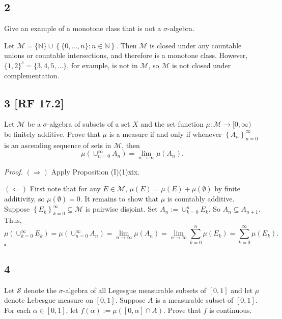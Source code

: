 \documentclass[12pt]{article}
\newcounter{ProofCounter}
\newenvironment{Proof}{\stepcounter{ProofCounter}\textit{Proof.}}{\hfill$\square$}
\begin{document}
\newpage
\subsection*{2}
\begin{tcolorbox}
Give an example of a monotone class that is not a $\sigma$-algebra.
\end{tcolorbox}

Let $\mathcal{M} = \{\mathbb{N}\} \cup \left\{ \{0,\hdots,n\} : n \in \mathbb{N} \right\}$. Then $\mathcal{M}$ is closed under any
countable unions or countable intersections, and therefore is a monotone class. However, $\{1,2\}^{c} = \{3, 4, 5, \hdots\}$, for example, is not in
$\mathcal{M}$, so $\mathcal{M}$ is not closed under complementation.



\subsection*{3 [RF 17.2]}
\begin{tcolorbox}
Let $\mathcal{M}$ be a $\sigma$-algebra of subsets of a set $X$ and the set function $\mu : \mathcal{M} \rightarrow [0, \infty)$ be finitely additive.
Prove that $\mu$ is a measure if and only if whenever $\left\{ A_{n} \right\}_{n=0}^{\infty}$ is an ascending sequence of sets in $\mathcal{M}$, then 
\[ \mu\left( \cup_{n=0}^{\infty}A_{n} \right) = \lim_{n\rightarrow\infty}\mu(A_{n}). \]
\end{tcolorbox}


\begin{Proof}
$(\Rightarrow)$ Apply Proposition (I)(1)xix.

$(\Leftarrow)$ First note that for any $E \in \mathcal{M}$, $\mu(E) = \mu(E) + \mu(\emptyset)$ by finite additivity, so $\mu(\emptyset) = 0$. It
remains to show that $\mu$ is countably additive. Suppose $\left\{ E_{k} \right\}_{k=0}^{\infty} \subseteq \mathcal{M}$ is pairwise disjoint. Set
$A_{n} := \cup_{k=0}^{n}E_{k}$. So $A_{n} \subseteq A_{n+1}$. Thus,
\[ \mu\left( \cup_{k=0}^{\infty}E_{k} \right) = \mu\left( \cup_{n=0}^{\infty}A_{n} \right) = \lim_{n\rightarrow\infty}\mu(A_{n}) =
\lim_{n\rightarrow\infty}\sum_{k=0}^{n}\mu(E_{k}) = \sum_{k=0}^{\infty}\mu(E_{k}). \]
\end{Proof}


\subsection*{4}
\begin{tcolorbox}
Let $\mathcal{S}$ denote the $\sigma$-algebra of all Legesgue measurable subsets of $[0,1]$ and let $\mu$ denote Lebesgue measure on $[0,1]$. Suppose
$A$ is a measurable subset of $[0,1]$. For each $\alpha \in [0,1]$, let $f(\alpha) := \mu([0,\alpha]\cap A)$. Prove that $f$ is continuous.
\end{tcolorbox}
\end{document}
